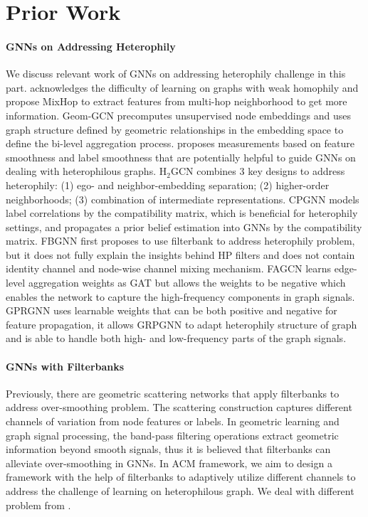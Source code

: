 \documentclass{article}
\newcommand{\0}{{\boldsymbol{0}}}
\newcommand{\6}{{\partial}}
\newcommand{\8}{{\infty}}
\newcommand{\4}{{\nabla}}
\begin{document}
\vspace*{-2.5mm}
\section{Prior Work}
\label{sec:related_works}
\paragraph{GNNs on Addressing Heterophily}
We discuss relevant work of GNNs on addressing heterophily challenge in this part. \cite{abu2019mixhop} acknowledges the difficulty of learning on graphs with weak homophily and propose MixHop to extract features from multi-hop neighborhood to get more information. Geom-GCN \cite{pei2020geom} precomputes unsupervised node embeddings and uses graph structure defined by geometric relationships in the embedding space to define the bi-level aggregation process. \cite{hou2019measuring} proposes measurements based on feature smoothness and label smoothness that are potentially helpful to guide GNNs on dealing with heterophilous graphs. H$_2$GCN \cite{zhu2020beyond} combines 3 key designs to address heterophily: (1) ego- and neighbor-embedding separation; (2) higher-order neighborhoods; (3) combination of intermediate representations. CPGNN \cite{zhu2020graph} models label correlations by the compatibility matrix, which is beneficial for heterophily settings, and propagates a prior belief estimation into GNNs by the compatibility matrix. FBGNN \cite{luan2020complete} first proposes to use filterbank to address heterophily problem, but it does not fully explain the insights behind HP filters and does not contain identity channel and node-wise channel mixing mechanism. FAGCN \cite{bo2021beyond} learns edge-level aggregation weights as GAT \cite{velivckovic2017attention} but allows the weights to be negative which enables the network to capture the high-frequency components in graph signals. GPRGNN \cite{chien2021adaptive} uses learnable weights that can be both positive and negative for feature propagation, it allows GRPGNN to adapt heterophily structure of graph and is able to handle both high- and low-frequency parts of the graph signals.
\vspace*{-2.5mm}
\paragraph{GNNs with Filterbanks}
Previously, there are geometric scattering networks \cite{gao2019geometric, min2020scattering} that apply filterbanks to address over-smoothing \cite{li2018deeper} problem. The scattering construction captures different channels of variation from node features or labels. In geometric learning and graph signal processing, the band-pass filtering operations extract geometric information beyond smooth signals, thus it is believed that filterbanks can alleviate over-smoothing in GNNs. In ACM framework, we aim to design a framework with the help of filterbanks to adaptively utilize different channels to address the challenge of learning on heterophilous graph. We deal with different problem from \cite{gao2019geometric, min2020scattering}. 
\vspace*{-2.5mm}
\end{document}
